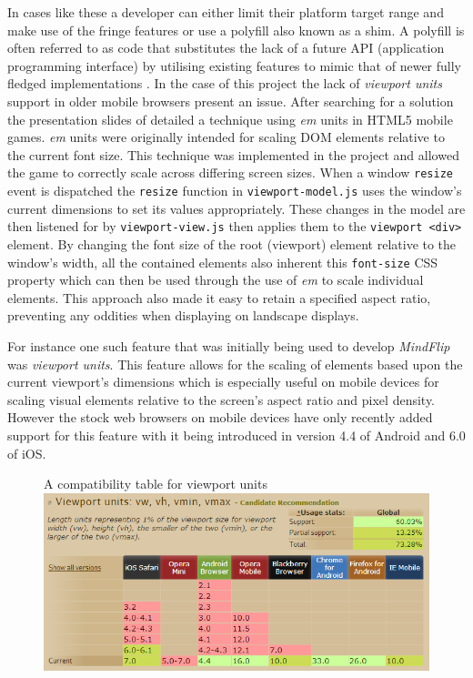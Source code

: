 \documentclass[final]{cmpreport}
\begin{document}
In cases like these a developer can either limit their platform target range and make use of the fringe features or use a polyfill also known as a shim. A polyfill is often referred to as code that substitutes the lack of a future API (application programming interface) by utilising existing features to mimic that of newer fully fledged implementations \cite{Lawson}. In the case of this project the lack of \textit{viewport units} support in older mobile browsers present an issue. After searching for a solution the presentation slides of \cite{Kadrmas} detailed a technique using \textit{em} units in HTML5 mobile games. \textit{em} units were originally intended for scaling DOM elements relative to the current font size. This technique was implemented in the project and allowed the game to correctly scale across differing screen sizes. When a window \texttt{resize} event is dispatched the \texttt{resize} function in \texttt{viewport-model.js} uses the window's current dimensions to set its values appropriately. These changes in the model are then listened for by \texttt{viewport-view.js} then applies them to the \texttt{viewport <div>} element. By changing the font size of the root (viewport) element relative to the window's width, all the contained elements also inherent this \texttt{font-size} CSS property which can then be used through the use of \textit{em} to scale individual elements. This approach also made it easy to retain a specified aspect ratio, preventing any oddities when displaying on landscape displays.

For instance one such feature that was initially being used to develop \textit{MindFlip} was \textit{viewport units}. This feature allows for the scaling of elements based upon the current viewport's dimensions which is especially useful on mobile devices for scaling visual elements relative to the screen's aspect ratio and pixel density. However the stock web browsers on mobile devices have only recently added support for this feature with it being introduced in version 4.4 of Android and 6.0 of iOS.

\begin{figure}[h]{A compatibility table for viewport units \label{viewport}}
  \includegraphics[width=1.0\textwidth]{viewport-units.png}
\end{figure}
\end{document}
